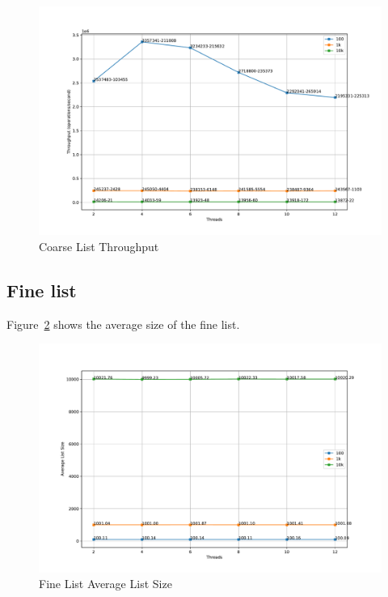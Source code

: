 \documentclass{article}
\begin{document}
\begin{figure}[H]
    \centering
    \includegraphics[width=\textwidth]{../test/plots/CoarseListThroughput.pdf}
    \caption{Coarse List Throughput}
    \label{fig:coarse-throughput}
\end{figure}

\subsection{Fine list}

Figure~\ref{fig:fine-size} shows the average size of the fine list.

\begin{figure}[H]
    \centering
    \includegraphics[scale=0.3]{../test/plots/FineListAverageListSize.pdf}
    \caption{Fine List Average List Size}
    \label{fig:fine-size}
\end{figure}
\end{document}
